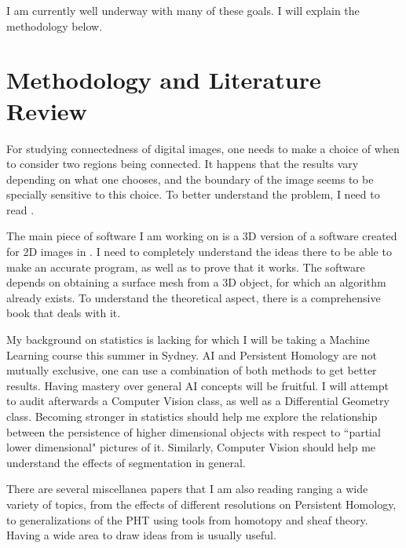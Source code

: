 \documentclass[12pt]{article}
\theoremstyle{theorem}
\theoremstyle{definition}
\theoremstyle{remark}
\theoremstyle{gremark}
\theoremstyle{discussion}
\theoremstyle{notation}
\begin{document}
	I am currently well underway with many of these goals. I will explain the methodology below. 
	
	\section*{Methodology and Literature Review}
	
		For studying connectedness of digital images, one needs to make a choice of when to consider two regions being connected. It happens that the results vary depending on what one chooses, and the boundary of the image seems to be specially sensitive to this choice. To better understand the problem, I need to read \cite{Bleile_2022}.
		
		The main piece of software I am working on is a 3D version of a software created for 2D images in \cite{turner_extended_2024}. I need to completely understand the ideas there to be able to make an accurate program, as well as to prove that it works. The software depends on obtaining a surface mesh from a 3D object, for which an algorithm already exists. To understand the theoretical aspect, there is a comprehensive book \cite{wenger_isosurfaces_2013} that deals with it.
		
		My background on statistics is lacking for which I will be taking a Machine Learning course this summer in Sydney. AI and Persistent Homology are not mutually exclusive, one can use a combination of both methods to get better results. Having mastery over general AI concepts will be fruitful. I will attempt to audit afterwards a Computer Vision class, as well as a Differential Geometry class. Becoming stronger in statistics should help me explore the relationship between the persistence of higher dimensional objects with respect to ``partial lower dimensional" pictures of it. Similarly, Computer Vision should help me understand the effects of segmentation in general.
		
		There are several miscellanea papers that I am also reading ranging a wide variety of topics, from the effects of different resolutions on Persistent Homology, to generalizations of the PHT using tools from homotopy and sheaf theory. Having a wide area to draw ideas from is usually useful.
		
	
		
		
	
	
	
\end{document}
